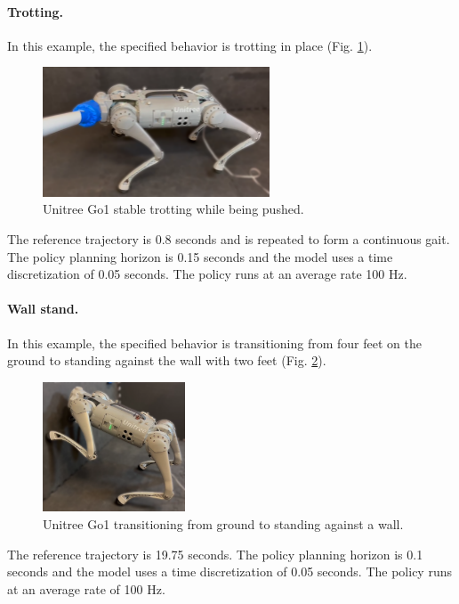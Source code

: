 \paragraph{Trotting.}
In this example, the specified behavior is trotting in place (Fig. \ref{cipc_quadruped_hardware_trot}). 

\begin{figure}[H]
	\centering
	\includegraphics[height=3.85cm]{ci_pc/cipc_quadruped_trot_push_blur.png}
	\caption[Unitree Go1 stable trotting while being pushed]{Unitree Go1 stable trotting while being pushed.}
	\label{cipc_quadruped_hardware_trot}
\end{figure}
The reference trajectory is 0.8 seconds and is repeated to form a continuous gait. The policy planning horizon is 0.15 seconds and the model uses a time discretization of 0.05 seconds. The policy runs at an average rate 100 Hz. 

\paragraph{Wall stand.}
In this example, the specified behavior is transitioning from four feet on the ground to standing against the wall with two feet (Fig. \ref{cipc_quadruped_hardware_wall}). 

\begin{figure}[H]
	\centering
	\includegraphics[height=3.85cm]{ci_pc/cipc_quadruped_wallstand_blur.png}
	\caption[Unitree Go1 transitioning from ground to standing against a wall]{Unitree Go1 transitioning from ground to standing against a wall.}
	\label{cipc_quadruped_hardware_wall}
\end{figure}
The reference trajectory is 19.75 seconds. The policy planning horizon is 0.1 seconds and the model uses a time discretization of 0.05 seconds. The policy runs at an average rate of 100 Hz. 

